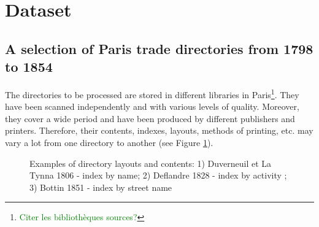 \section{Dataset}
\label{sec:dataset}






\subsection{A selection of Paris trade directories from 1798 to 1854}

The directories to be processed are stored in different libraries in Paris\footnote{\textcolor{green}{Citer les bibliothèques sources?} }. They have been scanned independently and with various levels of quality. Moreover, they cover a wide period and have been produced by different publishers and printers. Therefore, their contents, indexes, layouts, methods of printing, etc. may vary a lot from one directory to another (see Figure \ref{fig:directories}).


\begin{figure}[htb!]
	  \caption{\label{fig:directories} Examples of directory layouts and contents: 1) Duverneuil et La Tynna 1806 - index by name; 2) Deflandre 1828 - index by activity ; 3) Bottin 1851 - index by street name}
\end{figure}

